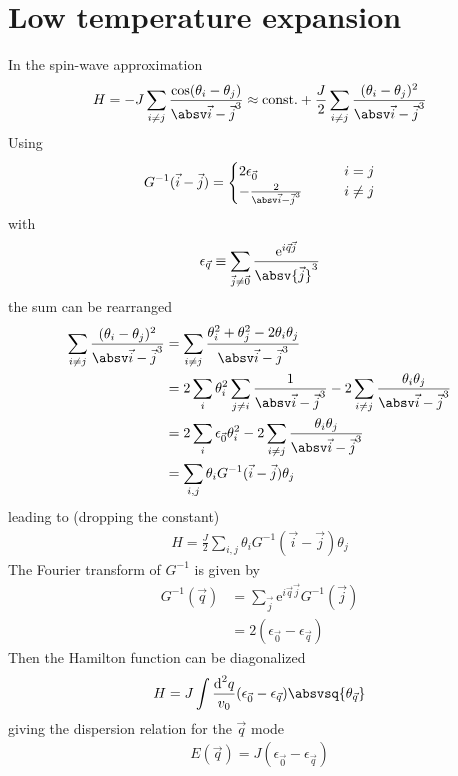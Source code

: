 \section{Low temperature expansion}
In the spin-wave approximation
\begin{align}
H=-J \sum_{i\ne j} \frac{\cos(\theta_i - \theta_j)}{\aij} \approx \text{const.} + \frac{J}{2} \sum_{i\ne j} \frac{(\theta_i - \theta_j)^2}{\aij}
\end{align}
Using
\begin{align}
G^{-1}(\vec{i}-\vec{j}) = \begin{cases}2\epsilon_{\vec{0}} \qquad  &i=j\\-\frac{2}{\aij}\qquad &i\ne j\end{cases}
\end{align}
with
\begin{align}
\epsilon_{\vec{q}} \equiv \sum_{\vec{j}\ne \vec{0}} \frac{\text{e}^{i \vec{q} \vec{j}}}{\absv{\vec{j}}^3}
\end{align}
the sum can be rearranged
\begin{align}
\sum_{i\ne j} \frac{(\theta_i - \theta_j)^2}{\aij} &= \sum_{i\ne j} \frac{\theta_i^2 + \theta_j^2- 2 \theta_i \theta_j}{\aij} \\
&=
2 \sum_i \theta_i^2 \sum_{j\ne i} \frac{1}{\aij} - 2 \sum_{i\ne j} \frac{\theta_i \theta_j}{\aij} \\
&=
2 \sum_i \epsilon_{\vec{0}} \theta_i^2 - 2 \sum_{i\ne j} \frac{\theta_i \theta_j}{\aij} \\
&= \sum_{i, j} \theta_i G^{-1}(\vec{i}-\vec{j}) \theta_j
\end{align}
leading to (dropping the constant)
\begin{align}
H=\frac{J}{2} \sum_{i, j} \theta_i G^{-1}(\vec{i}-\vec{j}) \theta_j
\end{align}
The Fourier transform of $G^{-1}$ is given by
\begin{align}
G^{-1}(\vec{q})&=\sum_{\vec{j}} \text{e}^{i \vec{q} \vec{j}} G^{-1}(\vec{j}) \\
&=2(\epsilon_{\vec{0}} - \epsilon_{\vec{q}})
\end{align}
Then the Hamilton function can be diagonalized
\begin{align}
H=J \int \frac{\text{d}^2q}{v_0} (\epsilon_{\vec{0}} - \epsilon_{\vec{q}}) \absvsq{\theta_{\vec{q}}}
\end{align}
giving the dispersion relation for the $\vec{q}$ mode
\begin{align}
E(\vec{q}) = J (\epsilon_{\vec{0}} - \epsilon_{\vec{q}})
\end{align}
